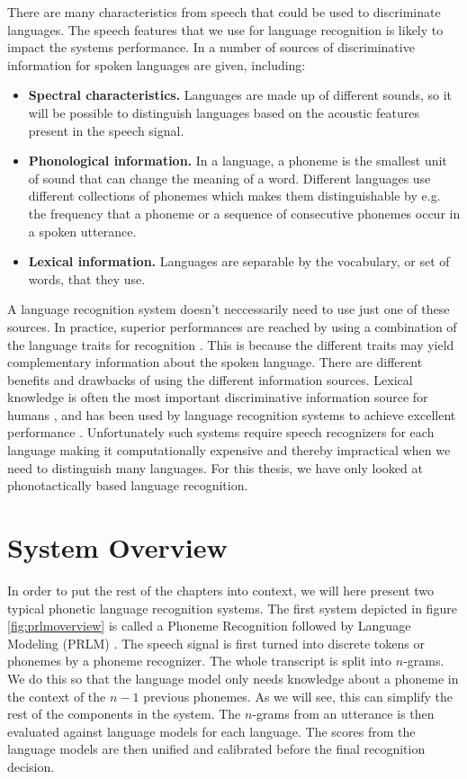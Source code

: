 There are many characteristics from speech that could be used to discriminate languages. The speech features that we use for language recognition is likely to impact the systems performance. In \cite[p. 801]{lidbok} a number of sources of discriminative information for spoken languages are given, including:

\begin{itemize}
\item \textbf{Spectral characteristics.} Languages are made up of different sounds, so it will be possible to distinguish languages based on the acoustic features present in the speech signal.
\item \textbf{Phonological information.} In a language, a phoneme is the smallest unit of sound that can change the meaning of a word. Different languages use different collections of phonemes which makes them distinguishable by e.g. the frequency that a phoneme or a sequence of consecutive phonemes occur in a spoken utterance.
\item \textbf{Lexical information.} Languages are separable by the vocabulary, or set of words, that they use.
\end{itemize}

A language recognition system doesn't neccessarily need to use just one of these sources. In practice, superior performances are reached by using a combination of the language traits for recognition \cite[p. 818]{lidbok}. This is because the different traits may yield complementary information about the spoken language. There are different benefits and drawbacks of using the different information sources. Lexical knowledge is often the most important discriminative information source for humans \cite[p. 787]{lidbkok}, and has been used by language recognition systems to achieve excellent performance \cite[p. 803]{lidbok}. Unfortunately such systems require speech recognizers for each language making it computationally expensive and thereby impractical when we need to distinguish many languages. For this thesis, we have only looked at phonotactically based language recognition.

\section{System Overview}
\label{sect:sysoverview}

In order to put the rest of the chapters into context, we will here present two typical phonetic language recognition systems. The first system depicted in figure \ref{fig:prlmoverview} is called a Phoneme Recognition followed by Language Modeling (PRLM) \cite[p. 817]{lidbok}. The speech signal is first turned into discrete tokens or phonemes by a phoneme recognizer.  The whole transcript is split into $n$-grams. We do this so that the language model only needs knowledge about a phoneme in the context of the $n-1$ previous phonemes. As we will see, this can simplify the rest of the components in the system. The $n$-grams from an utterance is then evaluated against language models for each language. The scores from the language models are then unified and calibrated before the final recognition decision.

